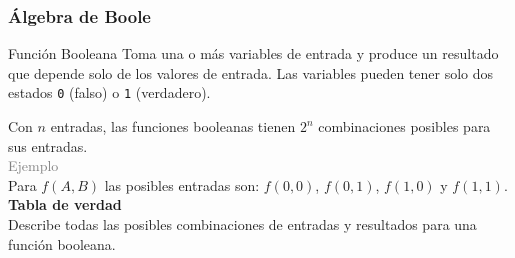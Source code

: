 \documentclass[aspectratio=169]{beamer}
\begin{document}
\begin{frame}[fragile]
    \frametitle{Álgebra de Boole}
    \begin{block}{\small Función Booleana}
    Toma una o más variables de entrada y produce un resultado que depende solo de los valores de entrada.
    Las variables pueden tener solo dos estados \texttt{0} (falso) o \texttt{1} (verdadero).
    \end{block}
    \pause
    Con $n$ entradas, las funciones booleanas tienen $2^n$ combinaciones posibles para sus entradas.\\
    \bigskip
    \textcolor{gray}{Ejemplo}\\
    Para $f(A,B)$ las posibles entradas son: \texttt{$f(0,0)$}, \texttt{$f(0,1)$}, \texttt{$f(1,0)$} y \texttt{$f(1,1)$}.\\
    \bigskip
    \textbf{Tabla de verdad}\\ Describe todas las posibles combinaciones de entradas y resultados para una función booleana.
\end{frame}
\end{document}
